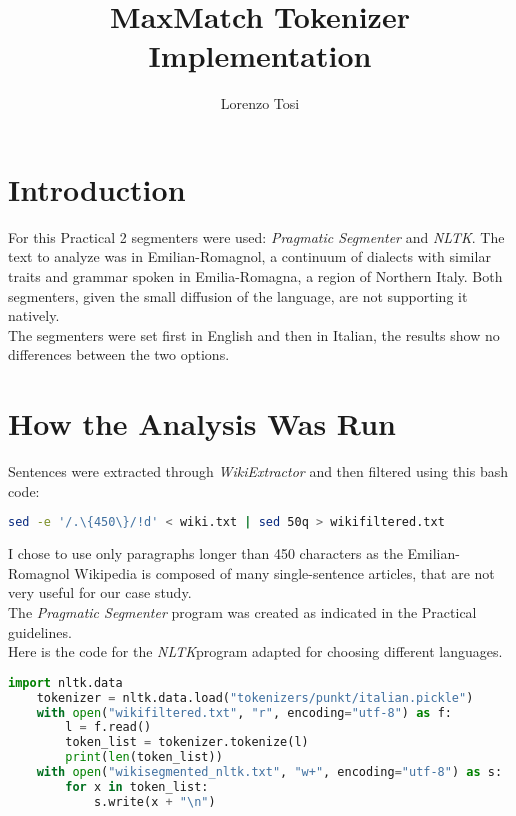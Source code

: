 \documentclass{hitec}
\author{Lorenzo Tosi}
\title{MaxMatch Tokenizer Implementation}
\begin{document}
	\maketitle
	\tableofcontents
	\section{Introduction}
	For this Practical 2 segmenters were used: \textit{Pragmatic Segmenter} and \textit{NLTK}. The text to analyze was in Emilian-Romagnol, a continuum of dialects with similar traits and grammar spoken in Emilia-Romagna, a region of Northern Italy. Both segmenters, given the small diffusion of the language, are not supporting it natively. \\
	The segmenters were set first in English and then in Italian, the results show no differences between the two options.
	\section{How the Analysis Was Run}
	Sentences were extracted through \textit{WikiExtractor} and then filtered using this bash code:
	\begin{lstlisting}[language=bash]
	sed -e '/.\{450\}/!d' < wiki.txt | sed 50q > wikifiltered.txt
	\end{lstlisting}
	I chose to use only paragraphs longer than 450 characters as the Emilian-Romagnol Wikipedia is composed of many single-sentence articles, that are not very useful for our case study. \\
	The \textit{Pragmatic Segmenter} program was created as indicated in the Practical guidelines. \\
	Here is the code for the \textit{NLTK}program adapted for choosing different languages.
	\begin{lstlisting}[language=python]
	import nltk.data
	tokenizer = nltk.data.load("tokenizers/punkt/italian.pickle")
	with open("wikifiltered.txt", "r", encoding="utf-8") as f:
		l = f.read()
		token_list = tokenizer.tokenize(l)
		print(len(token_list))
	with open("wikisegmented_nltk.txt", "w+", encoding="utf-8") as s:
		for x in token_list:	
			s.write(x + "\n")
	\end{lstlisting}
\end{document}
